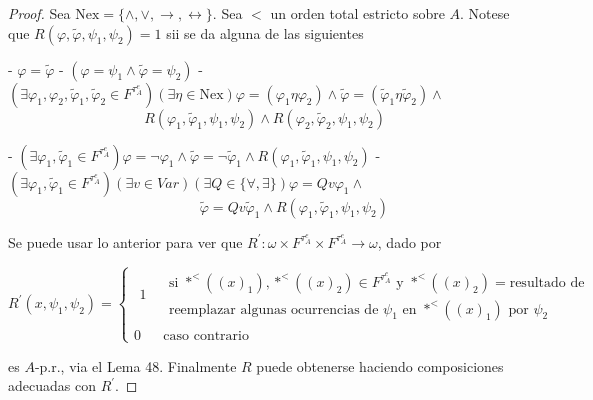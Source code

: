   \begin{proof}
    Sea $\mathrm{Nex}=\{\wedge ,\vee ,\rightarrow ,\leftrightarrow \}$. Sea $< $ un orden total estricto sobre $A$. Notese que $R(\varphi ,\tilde{\varphi} ,\psi_{1},\psi_{2})=1$ sii se da alguna de las siguientes

    - $\varphi =\tilde{\varphi}$
    - $(\varphi =\psi_{1}\wedge \tilde{\varphi}=\psi_{2})$
    - $(\exists \varphi _{1},\varphi _{2},\tilde{\varphi}_{1},\tilde{ \varphi}_{2}\in F^{\tau_{A}^{e}})(\exists \eta \in \mathrm{Nex})\varphi =(\varphi _{1}\eta \varphi _{2})\wedge \tilde{\varphi}=(\tilde{\varphi} _{1}\eta \tilde{\varphi}_{2})\wedge $
    $\;\;\;\;\;\;\;\;\;\;\;\;\;\;\;\;\;\;\;\;\;\;\;\;\;\;\;\;\;\;\;\;\;\;\;R( \varphi _{1},\tilde{\varphi}_{1},\psi_{1},\psi_{2})\wedge R(\varphi _{2}, \tilde{\varphi}_{2},\psi_{1},\psi_{2})$

    - $(\exists \varphi _{1},\tilde{\varphi}_{1}\in F^{\tau_{A}^{e}})\varphi =\lnot \varphi _{1}\wedge \tilde{\varphi}=\lnot \tilde{ \varphi}_{1}\wedge R(\varphi _{1},\tilde{\varphi}_{1},\psi_{1},\psi_{2})$
    - $(\exists \varphi _{1},\tilde{\varphi}_{1}\in F^{\tau_{A}^{e}})(\exists v\in Var)(\exists Q\in \{\forall ,\exists \})\varphi =Qv\varphi _{1}\wedge $
    $\ \ \ \ \ \ \ \ \ \ \ \ \ \ \ \ \ \ \ \ \ \ \ \ \ \ \ \ \ \ \ \ \ \ \ \ \ \ \ \ \ \ \ \ \ \ \ \ \ \ \ \ \ \ \ \ \ \ \ \ \ \ \tilde{\varphi}=Qv\tilde{ \varphi}_{1}\wedge R(\varphi _{1},\tilde{\varphi}_{1},\psi_{1},\psi_{2})$

    Se puede usar lo anterior para ver que $R^{\prime }:\omega \times F^{\tau_{A}^{e}}\times F^{\tau_{A}^{e}}\rightarrow \omega $, dado por

    $\displaystyle R^{\prime }(x,\psi_{1},\psi_{2})=\left\{ \begin{array}{cc} \begin{array}{c} 1 \\ \; \end{array} & \begin{array}{c} \text{si }\ast ^{< }((x)_{1}),\ast ^{< }((x)_{2})\in F^{\tau_{A}^{e}}\text{ y }\ast ^{< }((x)_{2})=\text{resultado de} \\ \text{reemplazar algunas ocurrencias de }\psi_{1}\text{ en }\ast ^{< }((x)_{1})\text{ por }\psi_{2} \end{array} \\ 0 & \text{caso contrario} \end{array} \right. $

    es $A$-p.r., via el Lema 48. Finalmente $R$ puede obtenerse haciendo composiciones adecuadas con $R^{\prime }$.
  \end{proof}

